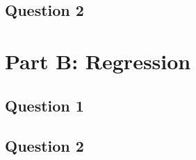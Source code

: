 \documentclass{article}
\begin{document}
\subsection*{Question 2}

\section*{Part B: Regression}
\subsection*{Question 1}

\subsection*{Question 2}
\end{document}
